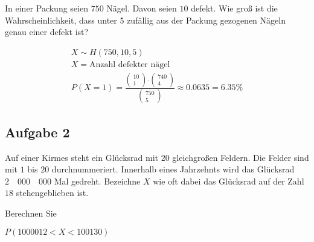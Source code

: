 In einer Packung seien $750$ Nägel. Davon seien $10$ defekt. Wie groß ist die
Wahrscheinlichkeit, dass unter 5 zufällig aus der Packung gezogenen Nägeln
genau einer defekt ist?

\begin{align*}
    X \sim H(750, 10, 5)             \\
    X = \text{Anzahl defekter nägel} \\
    P(X = 1) = \frac{\begin{pmatrix}
                             10 \\ 1
                         \end{pmatrix} \cdot
        \begin{pmatrix}
            740 \\ 4
        \end{pmatrix}}{\begin{pmatrix}
                           750 \\ 5
                       \end{pmatrix}} \approx 0.0635 = 6.35\%
\end{align*}

\subsection{Aufgabe 2}

Auf einer Kirmes steht ein Glücksrad mit $20$ gleichgroßen Feldern. Die Felder
sind mit $1$ bis $20$ durchnummeriert. Innerhalb eines Jahrzehnts wird das
Glücksrad $2\quad 000\quad 000$ Mal gedreht. Bezeichne $X$ wie oft dabei das
Glücksrad auf der Zahl $18$ stehengeblieben ist.

Berechnen Sie

$P(1000012 < X < 100130)$

